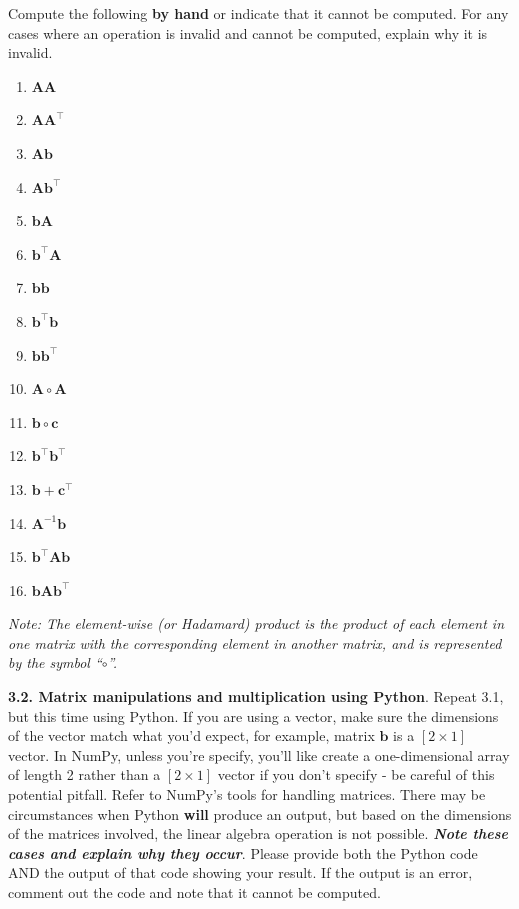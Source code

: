 \documentclass[
  letterpaper,
  DIV=11,
  numbers=noendperiod]{scrartcl}
\providecommand{\tightlist}{%
  \setlength{\itemsep}{0pt}\setlength{\parskip}{0pt}}\usepackage{longtable,booktabs,array}
\begin{document}
Compute the following \textbf{by hand} or indicate that it cannot be
computed. For any cases where an operation is invalid and cannot be
computed, explain why it is invalid.

\begin{enumerate}
\def\labelenumi{\arabic{enumi}.}
\tightlist
\item
  \(\mathbf{A}\mathbf{A}\)
\item
  \(\mathbf{A}\mathbf{A}^{\top}\)
\item
  \(\mathbf{A}\mathbf{b}\)
\item
  \(\mathbf{A}\mathbf{b}^{\top}\)
\item
  \(\mathbf{b}\mathbf{A}\)
\item
  \(\mathbf{b}^{\top}\mathbf{A}\)
\item
  \(\mathbf{b}\mathbf{b}\)
\item
  \(\mathbf{b}^{\top}\mathbf{b}\)
\item
  \(\mathbf{b}\mathbf{b}^{\top}\)
\item
  \(\mathbf{A}\circ\mathbf{A}\)
\item
  \(\mathbf{b}\circ\mathbf{c}\)
\item
  \(\mathbf{b}^{\top}\mathbf{b}^{\top}\)
\item
  \(\mathbf{b} + \mathbf{c}^{\top}\)
\item
  \(\mathbf{A}^{-1}\mathbf{b}\)
\item
  \(\mathbf{b}^{{\top}}\mathbf{A}\mathbf{b}\)
\item
  \(\mathbf{b}\mathbf{A}\mathbf{b}^{{\top}}\)
\end{enumerate}

\emph{Note: The element-wise (or Hadamard) product is the product of
each element in one matrix with the corresponding element in another
matrix, and is represented by the symbol ``\(\circ\)''.}

\textbf{3.2. Matrix manipulations and multiplication using Python}.
Repeat 3.1, but this time using Python. If you are using a vector, make
sure the dimensions of the vector match what you'd expect, for example,
matrix \(\mathbf{b}\) is a \([2 \times 1]\) vector. In NumPy, unless
you're specify, you'll like create a one-dimensional array of length 2
rather than a \([2 \times 1]\) vector if you don't specify - be careful
of this potential pitfall. Refer to NumPy's tools for handling matrices.
There may be circumstances when Python \textbf{will} produce an output,
but based on the dimensions of the matrices involved, the linear algebra
operation is not possible. \textbf{\emph{Note these cases and explain
why they occur}}. Please provide both the Python code AND the output of
that code showing your result. If the output is an error, comment out
the code and note that it cannot be computed.
\end{document}
